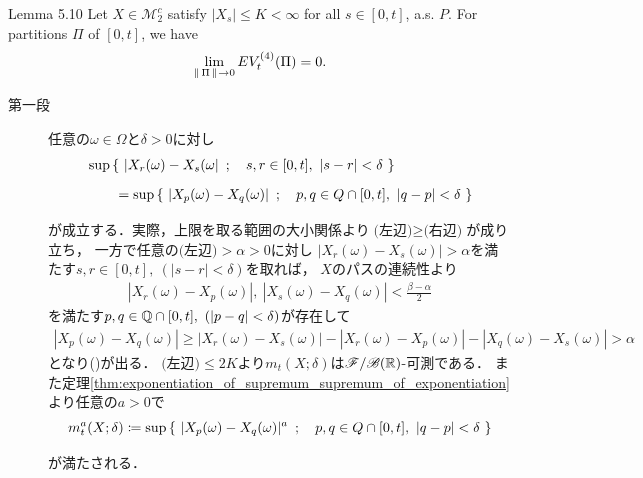 	\begin{itembox}[l]{Lemma 5.10}
		Let $X \in \mathscr{M}_2^c$ satisfy $|X_s| \leq K < \infty$ for all $s \in [0,t]$, a.s. $P$.
		For partitions $\Pi$ of $[0,t]$, we have
		\begin{align}
			\lim_{\left\|\, \Pi\, \right\|_{} \to 0} E V_t^{(4)}(\Pi) = 0.
		\end{align}
	\end{itembox}
	
	\begin{prf}\mbox{}
		\begin{description}
			\item[第一段] 
				任意の$\omega \in \Omega$と$\delta > 0$に対し
				\begin{align}
					&\operatorname*{sup}_{} \left\{\ |X_r(\omega) - X_s(\omega|\ \, ; \quad s,r \in [0,t],\ |s-r| < \delta\ \right\} \\
					&\qquad = \operatorname*{sup}_{} \left\{\ |X_p(\omega) - X_q(\omega)|\ \, ; \quad p,q \in Q \cap [0,t],\ |q-p| < \delta\ \right\}
					\label{eq:chapter_1_lemma_5_10_1}
				\end{align}
				が成立する．実際，上限を取る範囲の大小関係より$\mbox{(左辺)} \geq \mbox{(右辺)}$が成り立ち，
				一方で任意の$\mbox{(左辺)} > \alpha > 0$に対し
				$|X_r(\omega) - X_s(\omega)| > \alpha$を満たす$s,r \in [0,t],\ (|s-r| < \delta)$を取れば，
				$X$のパスの連続性より
				\begin{align}
					|X_r(\omega) - X_p(\omega)|,\ |X_s(\omega) - X_q(\omega)| < \frac{\beta-\alpha}{2}
				\end{align}
				を満たす$p,q \in \mathbb{Q} \cap [0,t],\ (|p-q| < \delta)$が存在して
				\begin{align}
					|X_p(\omega) - X_q(\omega)| \geq |X_r(\omega) - X_s(\omega) | - |X_r(\omega) - X_p(\omega)| - |X_q(\omega) - X_s(\omega)| > \alpha
				\end{align}
				となり()が出る．
				$\mbox{(左辺)} \leq 2K$より$m_t(X;\delta)$は$\mathscr{F}/\mathscr{B}(\mathbb{R})$-可測である．
				また定理\ref{thm:exponentiation_of_supremum_supremum_of_exponentiation}より任意の$a > 0$で
				\begin{align}
					m_t^a(X;\delta) 
					\coloneqq \operatorname*{sup}_{} \left\{\ |X_p(\omega) - X_q(\omega)|^a\ \, ; \quad p,q \in Q \cap [0,t],\ |q-p| < \delta\ \right\}
				\end{align}
				が満たされる．
				

\end{description}
\end{prf}
